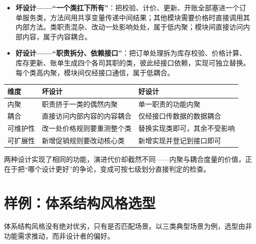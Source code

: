 \documentclass[12pt,a4paper,twoside,openany]{ctexbook}
\numberwithin{figure}{chapter}
\numberwithin{table}{chapter}
\providecommand{\tightlist}{\setlength{\itemsep}{0pt}\setlength{\parskip}{0pt}}
\newcounter{none}
\begin{document}
\begin{itemize}
\tightlist
\item
  \textbf{坏设计------``一个类扛下所有''}：把校验、计价、更新、开账全部塞进一个订单服务类，方法间用共享变量传递中间结果；其他模块需要价格时直接调用其内部方法。类职责混杂、改动一处影响处处，属于低内聚；模块间直接访问内部内容，属于内容耦合。
\item
  \textbf{好设计------``职责拆分、依赖接口''}：把订单处理拆为库存校验、价格计算、库存更新、账单生成四个各司其职的类，彼此经接口依赖，实现可独立替换。每个类高内聚，模块间仅经接口通信，属于低耦合。
\end{itemize}

{\def\LTcaptype{none} %
\begin{longtable}[]{@{}lll@{}}
\toprule\noalign{}
维度 & 坏设计 & 好设计 \\
\midrule\noalign{}
\endhead
\bottomrule\noalign{}
\endlastfoot
内聚 & 职责挤于一类的偶然内聚 & 单一职责的功能内聚 \\
耦合 & 直接访问内部内容的内容耦合 & 仅经接口传数据的数据耦合 \\
可维护性 & 改一处价格规则要重测整个类 & 替换实现类即可，其余不受影响 \\
可扩展性 & 新增促销规则要改动核心类 & 新增实现并登记到接口即可 \\
\end{longtable}
}

两种设计实现了相同的功能，演进代价却截然不同------内聚与耦合度量的价值，正在于把``哪个设计更好''的争论，变成可按七级划分直接判定的检查。

\section{样例：体系结构风格选型}\label{ux6837ux4f8bux4f53ux7cfbux7ed3ux6784ux98ceux683cux9009ux578b}

体系结构风格没有绝对优劣，只有是否匹配场景。以三类典型场景为例，选型由非功能需求推动，而非设计者的偏好。
\end{document}
